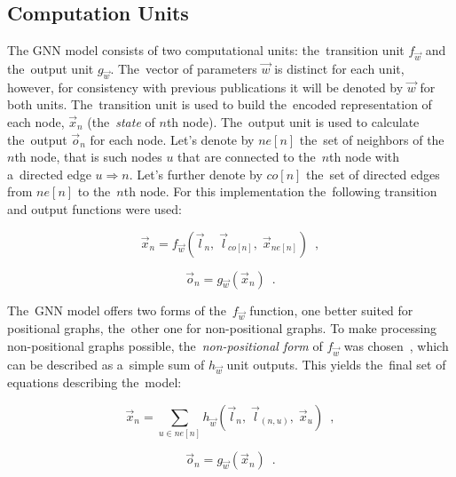 \documentclass{llncs}
\begin{document}
\subsection{Computation Units}
\noindent The GNN model consists of two computational units: the~transition unit $f_{\vec{w}}$ and the~output unit $g_{\vec{w}}$. The~vector of parameters $\vec{w}$ is distinct for each unit, however, for consistency with previous publications it will be denoted by $\vec{w}$ for both units. The~transition unit is used to build the~encoded representation of each node, $\vec{x}_n$ (the~\emph{state} of $n$th node). The~output unit is used to calculate the~output $\vec{o}_n$ for each node. Let's denote by $ne[n]$ the~set of neighbors of the~$n$th node, that is such nodes $u$ that are connected to the~$n$th node with a~directed edge $u \Rightarrow n$. Let's further denote by $co[n]$ the~set of directed edges from $ne[n]$ to the~$n$th node. For this implementation the~following transition and output functions were used:

\begin{equation}
\vec{x}_n = f_{\vec{w}}(\vec{l}_n, \; \vec{l}_{co[n]}, \; \vec{x}_{ne[n]}) \enspace ,
\label{eq:gnn_fmin}
\end{equation}

\begin{equation}
\vec{o}_n = g_{\vec{w}}(\vec{x}_n) \enspace .
\label{eq:gnn_gmin}
\end{equation}

\noindent The~GNN model offers two forms of the~$f_{\vec{w}}$ function, one better suited for positional graphs, the~other one for non-positional graphs. To make processing non-positional graphs possible, the~\emph{non-positional form} of $f_{\vec{w}}$ was chosen~\cite{scarselli2009graph}, which can be described as a~simple sum of $h_{\vec{w}}$ unit outputs. This yields the~final set of equations describing the~model:

\begin{equation}
\vec{x}_n = \sum_{u \in ne[n]}h_{\vec{w}}(\vec{l}_n, \; \vec{l}_{(n,u)}, \; \vec{x}_{u}) \enspace ,
\label{eq:gnn_ffinal}
\end{equation}

\begin{equation}
\vec{o}_n = g_{\vec{w}}(\vec{x}_n) \enspace .
\label{eq:gnn_gfinal}
\end{equation}
\end{document}
